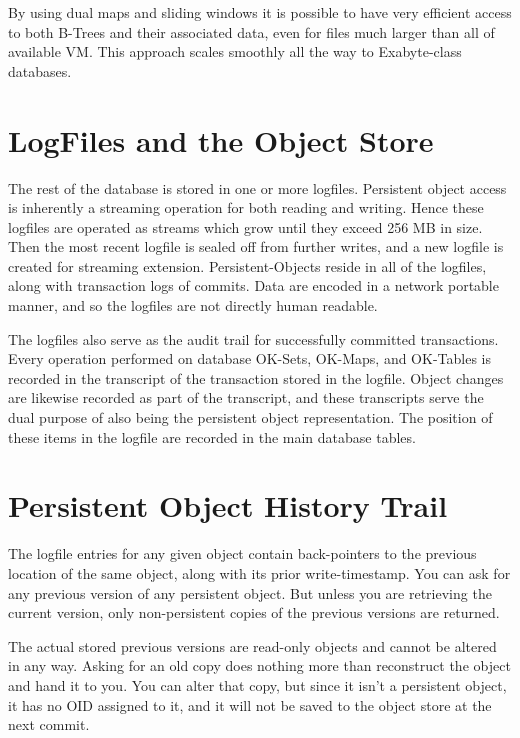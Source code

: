 \documentclass[article,oneside]{memoir}
\begin{document}
By using dual maps and sliding windows it is possible to have very efficient access to both B-Trees and their associated data, even for files much larger than all of available VM. This approach scales smoothly all the way to Exabyte-class databases.

\section{LogFiles and the Object Store}
The rest of the database is stored in one or more logfiles. Persistent object access is inherently a streaming operation for both reading and writing. Hence these logfiles are operated as streams which grow until they exceed 256 MB in size. Then the most recent logfile is sealed off from further writes, and a new logfile is created for streaming extension. {\ttfamily Persistent-Object}s reside in all of the logfiles, along with transaction logs of commits. Data are encoded in a network portable manner, and so the logfiles are not directly human readable.

The logfiles also serve as the audit trail for successfully committed transactions. Every operation performed on database OK-Sets, OK-Maps, and OK-Tables is recorded in the transcript of the transaction stored in the logfile. Object changes are likewise recorded as part of the transcript, and these transcripts serve the dual purpose of also being the persistent object representation. The position of these items in the logfile are recorded in the main database tables.

\section{Persistent Object History Trail}
The logfile entries for any given object contain back-pointers to the previous location of the same object, along with its prior write-timestamp. You can ask for any previous version of any persistent object. But unless you are retrieving the current version, only non-persistent copies of the previous versions are returned. 

The actual stored previous versions are read-only objects and cannot be altered in any way. Asking for an old copy does nothing more than reconstruct the object and hand it to you. You can alter that copy, but since it isn't a persistent object, it has no OID assigned to it, and it will not be saved to the object store at the next commit.
\end{document}
